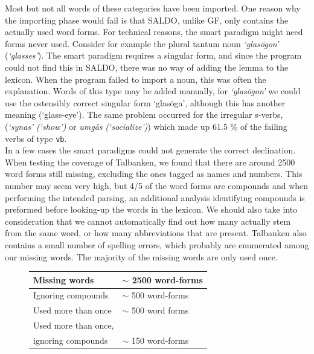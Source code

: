 \documentclass[10pt, a4paper]{article}
\begin{document}
Most but not all words of these categories have been imported.
One reason why the importing phase would fail 
is that SALDO, unlike GF, only contains the actually used word forms.
For technical reasons, the smart paradigm might need forms never used.
Consider for example the plural tantum 
noun \emph{`glas{\"o}gon'} (\emph{`glasses'}).
The smart paradigm requires a singular form, and since the program could not
find this in SALDO, there was no way of adding the lemma to the lexicon. 
When the program failed to import a noun, this was often the explanation.
Words of this type may be added manually, for \emph{`glas{\"o}gon'} we could use
the ostensibly correct singular form `glas{\"o}ga', although this
has another meaning (`glass-eye').
The same problem occurred for the irregular s-verbs,
(\emph{`synas'} \emph{(`show')} or \emph{umg{\aa}s} \emph{(`socialize')})
which made up 61.5 \% of the failing verbs of type \verb_vb_.\\
In a few cases the smart paradigms could not generate the correct declination.\\

When testing the coverage of Talbanken,
we found that there are around 2500 word forms still missing, excluding the ones
tagged as names and numbers. This number may seem very high, but 
4/5 of the word forms are compounds and when performing the intended parsing,
an additional analysis identifying compounds is preformed before
looking-up the words in the lexicon. We
should also take into consideration that 
we cannot automatically find out how many actually stem from the same word, or
how many abbreviations that are present. Talbanken also contains a small number of 
spelling errors, which probably are enumerated among our missing words. The majority
of the missing words are only used once.\\

\begin{figure}[h]
\begin{tabular}{|l|l|}
\hline
Missing words &$\sim$ 2500 word-forms\\
\hline
\hline
Ignoring compounds & $\sim$ 500 word-forms\\
Used more than once & $\sim$ 500 word forms\\
Used more than once,& \\
\hspace{2mm} ignoring compounds & $\sim$ 150 word-forms\\
\hline
\end{tabular}
\caption{}
\end{figure}
\end{document}

